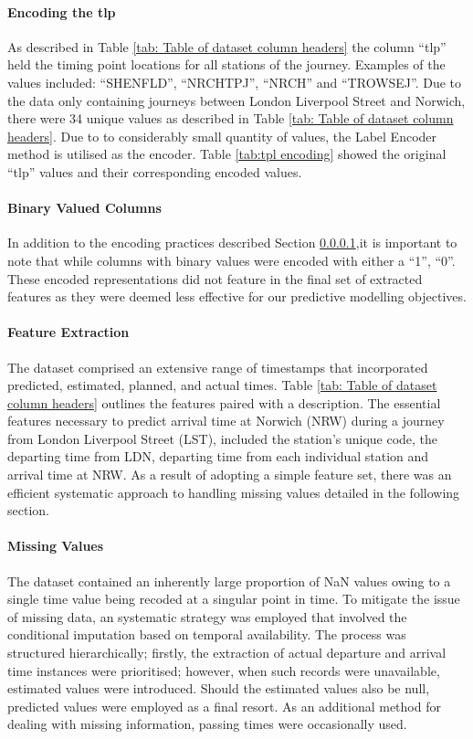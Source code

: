 \paragraph{Encoding the tlp}\label{sec: Encoding the tlp}
As described in Table \ref{tab: Table of dataset column headers} the column ``tlp'' held the timing point locations for all stations of the journey. Examples of the values included: ``SHENFLD'', ``NRCHTPJ'', ``NRCH'' and ``TROWSEJ''. Due to the data only containing journeys between London Liverpool Street and Norwich, there were 34 unique values as described in Table \ref{tab: Table of dataset column headers}. Due to to considerably small quantity of values, the Label Encoder method is utilised as the encoder. Table \ref{tab:tpl encoding} showed the original ``tlp'' values and their corresponding encoded values.

\paragraph{Binary Valued Columns}
In addition to the encoding practices described Section \ref{sec: Encoding the tlp},it is important to note that while columns with binary values were encoded with either a ``1'', ``0''. These encoded representations did not feature in the final set of extracted features as they were deemed less effective for our predictive modelling objectives.

\paragraph{Feature Extraction}
The dataset comprised an extensive range of timestamps that incorporated predicted, estimated, planned, and actual times. Table \ref{tab: Table of dataset column headers} outlines the features paired with a description. The essential features necessary to predict arrival time at Norwich (NRW) during a journey from London Liverpool Street (LST), included the station's unique code, the departing time from LDN, departing time from each individual station and arrival time at NRW. As a result of adopting a simple feature set, there was an efficient systematic approach to handling missing values detailed in the following section.

\paragraph{Missing Values}\label{sec: missing values} The dataset contained an inherently large proportion of NaN values owing to a single time value being recoded at a singular point in time. To mitigate the issue of missing data, an systematic strategy was employed that involved the conditional imputation based on temporal availability. The process was structured hierarchically; firstly, the extraction of actual departure and arrival time instances were prioritised; however, when such records were unavailable, estimated values were introduced. Should the estimated values also be null, predicted values were employed as a final resort. As an additional method for dealing with missing information, passing times were occasionally used.